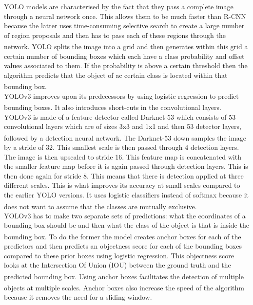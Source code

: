 \documentclass[11pt]{article}		%
\newcommand{\supercite}[1]{\textsuperscript{\cite{#1}}}		%
\begin{document}
	        YOLO models are characterised by the fact that they pass a complete image through a neural network once. This allows them to be much faster than R-CNN because the latter uses time-consuming selective search to create a large number of region proposals and then has to pass each of these regions through the network.\supercite{YOLO2} \supercite{R-CNN} YOLO splits the image into a grid and then generates within this grid a certain number of bounding boxes which each have a class probability and offset values associated to them. If the probability is above a certain threshold then the algorithm predicts that the object of ac certain class is located within that bounding box.\supercite{Object_detection} 
	        \\
	        YOLOv3 improves upon its predecessors by using logistic regression to predict bounding boxes.\supercite{YOLOV3} It also introduces short-cuts in the convolutional layers.
	        YOLOv3 is made of a feature detector called Darknet-53 which consists of 53 convolutional layers which are of sizes 3x3 and 1x1 and then 53 detector layers, followed by a detection neural network. \supercite{YOLOV3}
	        The Darknet-53 down samples the image by a stride of 32. This smallest scale is then passed through 4 detection layers. The image is then upscaled to stride 16. This feature map is concatenated with the smaller feature map before it is again passed through detection layers. This is then done again for stride 8. This means that there is detection applied at three different scales. This is what improves its accuracy at small scales compared to the earlier YOLO versions. It uses logistic classifiers instead of softmax because it does not want to assume that the classes are mutually exclusive.\supercite{YOLOV3} 
	        \\
	        YOLOv3 has to make two separate sets of predictions: what the coordinates of a bounding box should be and then what the class of the object is that is inside the bounding box.\supercite{YOLOV3} To do the former the model creates anchor boxes for each of the predictors and then predicts an objectness score for each of the bounding boxes compared to these prior boxes using logistic regression. This objectness score looks at the Intersection Of Union (IOU) between the ground truth and the predicted bounding box.\supercite{YOLOV2}\supercite{YOLOV3} Using anchor boxes facilitates the detection of multiple objects at multiple scales.\supercite{Anchor_Boxes} Anchor boxes also increase the speed of the algorithm because it removes the need for a sliding window. 
\end{document}
